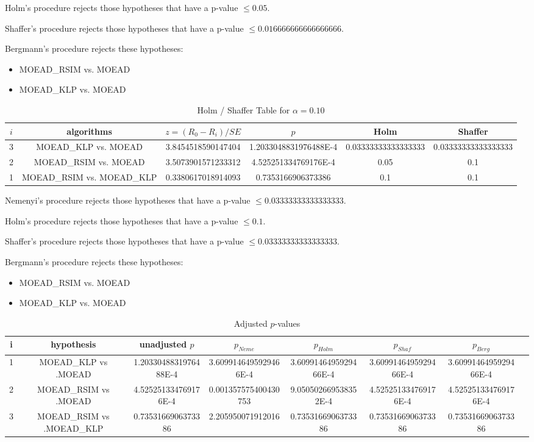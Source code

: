 \documentclass[a4paper,10pt]{article}
\begin{document}
\begin{landscape}
Holm's procedure rejects those hypotheses that have a p-value $\le0.05$.


Shaffer's procedure rejects those hypotheses that have a p-value $\le0.016666666666666666$.


Bergmann's procedure rejects these hypotheses:


\begin{itemize}


\item MOEAD_RSIM vs. MOEAD
\item MOEAD_KLP vs. MOEAD
\end{itemize}


\begin{table}[!htp]
\centering\tiny
\caption{Holm / Shaffer Table for $\alpha=0.10$}
\begin{tabular}{cccccc}
$i$&algorithms&$z=(R_0 - R_i)/SE$&$p$&Holm&Shaffer\\
\hline
3&MOEAD_KLP vs. MOEAD&3.8454518590147404&1.2033048831976488E-4&0.03333333333333333&0.03333333333333333\\
2&MOEAD_RSIM vs. MOEAD&3.5073901571233312&4.525251334769176E-4&0.05&0.1\\
1&MOEAD_RSIM vs. MOEAD_KLP&0.3380617018914093&0.7353166906373386&0.1&0.1\\
\hline
\end{tabular}
\end{table}
Nemenyi's procedure rejects those hypotheses that have a p-value $\le0.03333333333333333$.


Holm's procedure rejects those hypotheses that have a p-value $\le0.1$.


Shaffer's procedure rejects those hypotheses that have a p-value $\le0.03333333333333333$.


Bergmann's procedure rejects these hypotheses:


\begin{itemize}


\item MOEAD_RSIM vs. MOEAD
\item MOEAD_KLP vs. MOEAD
\end{itemize}


\begin{table}[!htp]
\centering\tiny
\caption{Adjusted $p$-values}
\begin{tabular}{cccccccc}
i&hypothesis&unadjusted $p$&$p_{Neme}$&$p_{Holm}$&$p_{Shaf}$&$p_{Berg}$\\
\hline
1&MOEAD_KLP vs .MOEAD&1.2033048831976488E-4&3.6099146495929466E-4&3.6099146495929466E-4&3.6099146495929466E-4&3.6099146495929466E-4\\
2&MOEAD_RSIM vs .MOEAD&4.525251334769176E-4&0.001357575400430753&9.050502669538352E-4&4.525251334769176E-4&4.525251334769176E-4\\
3&MOEAD_RSIM vs .MOEAD_KLP&0.7353166906373386&2.205950071912016&0.7353166906373386&0.7353166906373386&0.7353166906373386\\
\hline
\end{tabular}
\end{table}

\end{landscape}
\end{document}
